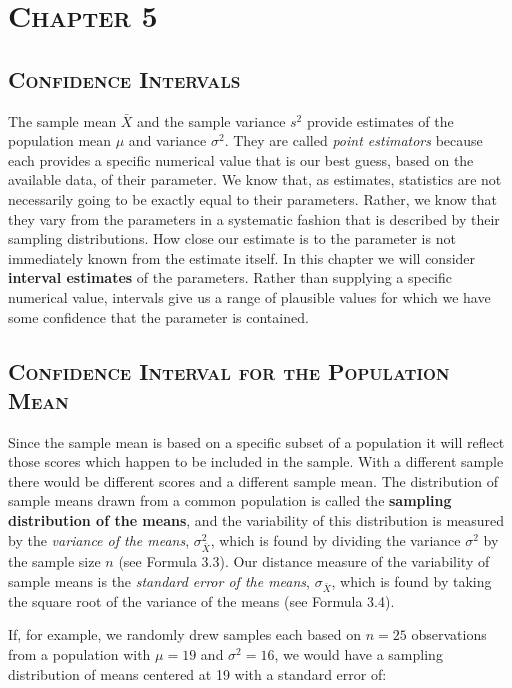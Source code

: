 \documentclass[12pt]{article}
\begin{document}

\chapter*{\centering \textsc{Chapter 5}}
\section*{\centering \textsc{Confidence Intervals}}

The sample mean $\bar{X}$ and the sample variance $s^2$ provide estimates of the population mean $\mu$ and variance $\sigma^2$. They are called \emph{point estimators} because each provides a specific numerical value that is our best guess, based on the available data, of their parameter. We know that, as estimates, statistics are not necessarily going to be exactly equal to their parameters. Rather, we know that they vary from the parameters in a systematic fashion that is described by their sampling distributions. How close our estimate is to the parameter is not immediately known from the estimate itself. In this chapter we will consider \textbf{interval estimates} of the parameters. Rather than supplying a specific numerical value, intervals give us a range of plausible values for which we have some confidence that the parameter is contained.

\section*{\textsc{Confidence Interval for the Population Mean}}

Since the sample mean is based on a specific subset of a population it will reflect those scores which happen to be included in the sample. With a different sample there would be different scores and a different sample mean. The distribution of sample means drawn from a common population is called the \textbf{sampling distribution of the means}, and the variability of this distribution is measured by the \emph{variance of the means}, $\sigma_{\bar{X}}^2$, which is found by dividing the variance $\sigma^2$ by the sample size $n$ (see Formula 3.3). Our distance measure of the variability of sample means is the \emph{standard error of the means}, $\sigma_{\bar{X}}$, which is found by taking the square root of the variance of the means (see Formula 3.4).

If, for example, we randomly drew samples each based on $n=25$ observations from a population with $\mu=19$ and $\sigma^2=16$, we would have a sampling distribution of means centered at 19 with a standard error of:
\end{document}
